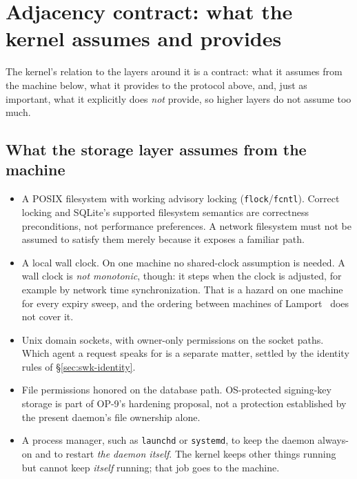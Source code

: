 \documentclass[11pt,a4paper]{article}
\theoremstyle{definition}
\theoremstyle{remark}
\begin{document}
\pdexercisepointer{\ref{ex:swk-hash-chain-adversary}}{\ref{ex:swk-op9-hardening}}{\pageref{ex:swk-hash-chain-adversary}}

\section{Adjacency contract: what the kernel assumes and provides}
\label{sec:adjacency}

The kernel's relation to the layers around it is a contract: what it assumes from
the machine below, what it provides to the protocol above, and, just as important,
what it explicitly does \emph{not} provide, so higher layers do not assume too much.

\subsection{What the storage layer assumes from the machine}
\begin{itemize}[leftmargin=1.4em]
  \item A POSIX filesystem with working advisory locking (\texttt{flock}/\texttt{fcntl}).
  Correct locking and SQLite's supported filesystem semantics are correctness
  preconditions, not performance preferences. A network filesystem must not
  be assumed to satisfy them merely because it exposes a familiar path.
  \item A local wall clock. On one machine no shared-clock assumption is needed.
%
  A wall clock is \emph{not monotonic}, though: it steps when the clock is adjusted,
  for example by network time synchronization. That is a hazard on one machine for
  every expiry sweep, and the ordering between machines of
  Lamport~ does not cover it.
  \item Unix domain sockets, with owner-only permissions on the socket paths.
  Which agent a request speaks for is a separate matter, settled by the identity
  rules of \S\ref{sec:swk-identity}.
  \item File permissions honored on the database path. OS-protected signing-key
  storage is part of OP-9's hardening proposal, not a protection established by
  the present daemon's file ownership alone.
  \item A process manager, such as \texttt{launchd} or \texttt{systemd}, to keep the
  daemon always-on and to restart \emph{the daemon itself}. The kernel keeps other
  things running but cannot keep \emph{itself} running; that job goes to the
  machine.
\end{itemize}
\end{document}
